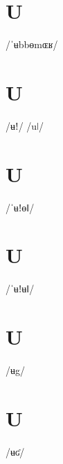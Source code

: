 \documentclass[10pt,a4paper,twoside]{book}
\begin{document}
\section*{U}

\begin{multicols}{3}
 {/ˈʉbbɵmɶʁ/} {}
\end{multicols}

\section*{U}

\begin{multicols}{3}
 {/ʉǃ/} {}
 {/uǀ/} {}
\end{multicols}

\section*{U}

\begin{multicols}{3}
 {/ˈʉǃɵǁ/} {}
\end{multicols}

\section*{U}

\begin{multicols}{3}
 {/ˈʉǃʉǁ/} {}
\end{multicols}

\section*{U}

\begin{multicols}{3}
 {/ʉg/} {}
\end{multicols}

\section*{U}

\begin{multicols}{3}
 {/ʉʛ/} {}
\end{multicols}
\end{document}
